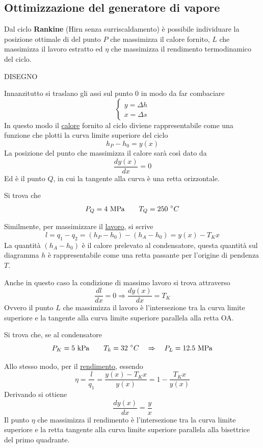 \subsection{Ottimizzazione del generatore di vapore}
\begin{adjustwidth}{2in}{}
	Dal ciclo \textbf{Rankine} (Hirn senza surriscaldamento) è possibile individuare la posizione ottimale di del punto $P$ che massimizza il calore fornito, $L$ che massimizza il lavoro estratto ed $\eta$ che massimizza il rendimento termodinamico del ciclo.  
	
	DISEGNO
	
	Innanzitutto si traslano gli assi sul punto $0$ in modo da far combaciare 
	\[\begin{cases}
		y = \Delta h\\
		x = \Delta s
	\end{cases}\]
	In questo modo il \underline{calore} fornito al ciclo diviene rappresentabile come una funzione che plotti la curva limite superiore del ciclo 
	\[h_P-h_0 = y(x)\]
	La posizione del punto che massimizza il calore sarà così dato da 
	\[\dfrac{dy(x)}{dx} = 0\]
	Ed è il punto $Q$, in cui la tangente alla curva è una retta orizzontale. 
	
	Si trova che 
	\[P_Q = 4~\text{MPa} \qquad T_Q = 250~\degree C\]
	
	Similmente, per massimizzare il \underline{lavoro}, si scrive 
	\[l = q_1-q_2 = (h_P-h_0) - (h_A-h_0) = y(x) - T_Kx \]
	La quantità $(h_A-h_0)$ è il calore prelevato al condensatore, questa quantità sul diagramma $h$ è rappresentabile come una retta passante per l'origine di pendenza $T$. 
	
	Anche in questo caso la condizione di massimo lavoro si trova attraverso
	\[\dfrac{dl}{dx} = 0 \Rightarrow \dfrac{dy(x)}{dx} = T_K\]
	Ovvero il punto $L$ che massimizza il lavoro è l'intersezione tra la curva limite superiore e la tangente alla curva limite superiore parallela alla retta OA.
	
	Si trova che, se al condensatore
	\[P_K = 5~\text{kPa} \qquad T_k = 32~\degree C \quad \Rightarrow \quad P_L = 12.5~\text{MPa}\]
	
	Allo stesso modo, per il \underline{rendimento}, essendo
	\[\eta = \dfrac{l}{q_1} = \dfrac{y(x)- T_Kx}{y(x)} = 1-\dfrac{T_Kx}{y(x)}\]
	Derivando si ottiene 
	\[\dfrac{dy(x)}{dx} = \dfrac{y}{x}\]
	Il punto $\eta$ che massimizza il rendimento è l'intersezione tra la curva limite superiore e la retta tangente alla curva limite superiore parallela alla bisettrice del primo quadrante.
	

\end{adjustwidth}
